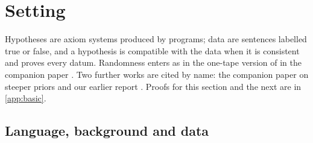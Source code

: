 \section{Setting}\label{sec:setting}

Hypotheses are axiom systems produced by programs; data are sentences labelled true or false, and a hypothesis is compatible with the data when it is consistent and proves every datum. Randomness enters as in the one-tape version of \SOI in the companion paper \citep{claudeSFI2026fundamentals}. Two further works are cited by name: the companion paper on steeper priors \citep{claudeSFI2026steeper} and our earlier report \citep{claude2026axiominduction}. Proofs for this section and the next are in \cref{app:basic}.

\subsection{Language, background and data}\label{sec:setting:data}

